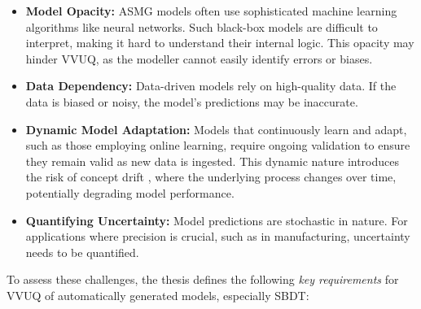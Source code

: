 \begin{itemize}
  \item \textbf{Model Opacity:} ASMG models often use sophisticated machine learning algorithms like neural networks. Such black-box models are difficult to interpret, making it hard to understand their internal logic. This opacity may hinder VVUQ, as the modeller cannot easily identify errors or biases.
  \item \textbf{Data Dependency:} Data-driven models rely on high-quality data. If the data is biased or noisy, the model's predictions may be inaccurate.
  \item \textbf{Dynamic Model Adaptation:} Models that continuously learn and adapt, such as those employing online learning, require ongoing validation to ensure they remain valid as new data is ingested. This dynamic nature introduces the risk of concept drift \autocite{lu2018learning}, where the underlying process changes over time, potentially degrading model performance.
  \item \textbf{Quantifying Uncertainty:} Model predictions are stochastic in nature. For applications where precision is crucial, such as in manufacturing, uncertainty needs to be quantified.
\end{itemize}

To assess these challenges, the thesis defines the following \textit{key requirements} for VVUQ of automatically generated models, especially SBDT:

